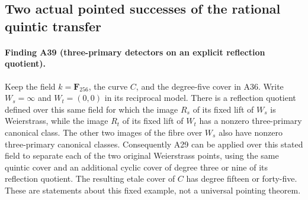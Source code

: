 \subsection{Two actual pointed successes of the rational quintic transfer}
\label{sec:pointed-quintic-success}

\paragraph{Finding A39 (three-primary detectors on an explicit reflection quotient).}
Keep the field $k=\mathbf F_{256}$, the curve $C$, and the
degree-five cover in A36. Write $W_s=\infty$ and
$W_t=(0,0)$ in its reciprocal model. There is a reflection
quotient defined over this same field for which the image $R_s$
of its fixed lift of $W_s$ is Weierstrass, while the image $R_t$
of its fixed lift of $W_t$ has a nonzero three-primary canonical
class. The other two images of the fibre over $W_s$ also have
nonzero three-primary canonical classes. Consequently A29 can
be applied over this stated field to separate each of the two
original Weierstrass points, using the same quintic cover and
an additional cyclic cover of degree three or nine of its
reflection quotient. The resulting etale cover of $C$ has
degree fifteen or forty-five. These are statements about this
fixed example, not a universal pointing theorem.

